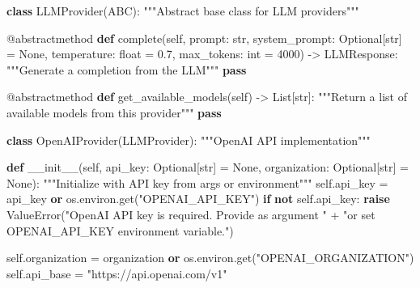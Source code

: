 \documentclass[
  11pt,
  letterpaper,
]{book}
\newenvironment{Shaded}{\begin{snugshade}}{\end{snugshade}}
\newcommand{\AttributeTok}[1]{\textcolor[rgb]{0.40,0.45,0.13}{#1}}
\newcommand{\BuiltInTok}[1]{\textcolor[rgb]{0.00,0.23,0.31}{#1}}
\newcommand{\CommentTok}[1]{\textcolor[rgb]{0.37,0.37,0.37}{#1}}
\newcommand{\ControlFlowTok}[1]{\textcolor[rgb]{0.00,0.23,0.31}{\textbf{#1}}}
\newcommand{\DecValTok}[1]{\textcolor[rgb]{0.68,0.00,0.00}{#1}}
\newcommand{\FloatTok}[1]{\textcolor[rgb]{0.68,0.00,0.00}{#1}}
\newcommand{\FunctionTok}[1]{\textcolor[rgb]{0.28,0.35,0.67}{#1}}
\newcommand{\KeywordTok}[1]{\textcolor[rgb]{0.00,0.23,0.31}{\textbf{#1}}}
\newcommand{\NormalTok}[1]{\textcolor[rgb]{0.00,0.23,0.31}{#1}}
\newcommand{\OperatorTok}[1]{\textcolor[rgb]{0.37,0.37,0.37}{#1}}
\newcommand{\PreprocessorTok}[1]{\textcolor[rgb]{0.68,0.00,0.00}{#1}}
\newcommand{\StringTok}[1]{\textcolor[rgb]{0.13,0.47,0.30}{#1}}
\newcommand{\VariableTok}[1]{\textcolor[rgb]{0.07,0.07,0.07}{#1}}
\begin{document}
\begin{Shaded}
\begin{Highlighting}[]
\KeywordTok{class}\NormalTok{ LLMProvider(ABC):}
    \CommentTok{"""Abstract base class for LLM providers"""}

    \AttributeTok{@abstractmethod}
    \KeywordTok{def}\NormalTok{ complete(}\VariableTok{self}\NormalTok{,}
\NormalTok{                prompt: }\BuiltInTok{str}\NormalTok{,}
\NormalTok{                system\_prompt: Optional[}\BuiltInTok{str}\NormalTok{] }\OperatorTok{=} \VariableTok{None}\NormalTok{,}
\NormalTok{                temperature: }\BuiltInTok{float} \OperatorTok{=} \FloatTok{0.7}\NormalTok{,}
\NormalTok{                max\_tokens: }\BuiltInTok{int} \OperatorTok{=} \DecValTok{4000}\NormalTok{) }\OperatorTok{{-}\textgreater{}}\NormalTok{ LLMResponse:}
        \CommentTok{"""Generate a completion from the LLM"""}
        \ControlFlowTok{pass}

    \AttributeTok{@abstractmethod}
    \KeywordTok{def}\NormalTok{ get\_available\_models(}\VariableTok{self}\NormalTok{) }\OperatorTok{{-}\textgreater{}}\NormalTok{ List[}\BuiltInTok{str}\NormalTok{]:}
        \CommentTok{"""Return a list of available models from this provider"""}
        \ControlFlowTok{pass}

\KeywordTok{class}\NormalTok{ OpenAIProvider(LLMProvider):}
    \CommentTok{"""OpenAI API implementation"""}

    \KeywordTok{def} \FunctionTok{\_\_init\_\_}\NormalTok{(}\VariableTok{self}\NormalTok{, api\_key: Optional[}\BuiltInTok{str}\NormalTok{] }\OperatorTok{=} \VariableTok{None}\NormalTok{, organization: Optional[}\BuiltInTok{str}\NormalTok{] }\OperatorTok{=} \VariableTok{None}\NormalTok{):}
        \CommentTok{"""Initialize with API key from args or environment"""}
        \VariableTok{self}\NormalTok{.api\_key }\OperatorTok{=}\NormalTok{ api\_key }\KeywordTok{or}\NormalTok{ os.environ.get(}\StringTok{"OPENAI\_API\_KEY"}\NormalTok{)}
        \ControlFlowTok{if} \KeywordTok{not} \VariableTok{self}\NormalTok{.api\_key:}
            \ControlFlowTok{raise} \PreprocessorTok{ValueError}\NormalTok{(}\StringTok{"OpenAI API key is required. Provide as argument "}
              \OperatorTok{+} \StringTok{"or set OPENAI\_API\_KEY environment variable."}\NormalTok{)}

        \VariableTok{self}\NormalTok{.organization }\OperatorTok{=}\NormalTok{ organization }\KeywordTok{or}\NormalTok{ os.environ.get(}\StringTok{"OPENAI\_ORGANIZATION"}\NormalTok{)}
        \VariableTok{self}\NormalTok{.api\_base }\OperatorTok{=} \StringTok{"https://api.openai.com/v1"}


\end{Highlighting}
\end{Shaded}
\end{document}
